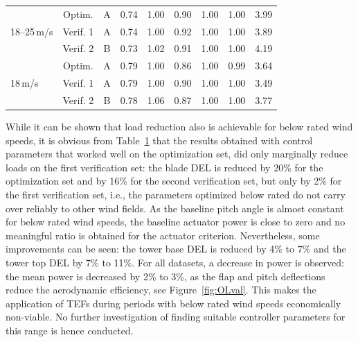 \begin{table}[h]
\begin{tabular}{@{}l*{8}{c}@{}}
        \midrule
        \multirow{3}{*}{18--25\,m/s} & Optim. & A & 0.74 & 1.00 & 0.90 & 1.00 & 1.00 & 3.99 \\
        & Verif. 1 & A & 0.74 & 1.00 & 0.92 & 1.00 & 1.00 & 3.89 \\
        & Verif. 2 & B & 0.73 & 1.02 & 0.91 & 1.00 & 1.00 & 4.19 \\
        \midrule
        \multirow{3}{*}{18\,m/s} & Optim. & A & 0.79 & 1.00 & 0.86 & 1.00 & 0.99 & 3.64 \\
        & Verif. 1 & A & 0.79 & 1.00 & 0.90 & 1.00 & 1.00 & 3.49 \\
        & Verif. 2 & B & 0.78 & 1.06 & 0.87 & 1.00 & 1.00 & 3.77 \\
        \bottomrule
    \end{tabular}
    \label{tabone}
\end{table}

While it can be shown that load reduction also is achievable for below rated wind speeds, it is obvious from Table~\ref{tabone} that the results obtained with control parameters that worked well on the optimization set, did only marginally reduce loads on the first verification set: the blade DEL is reduced by 20\% for the optimization set and by 16\% for the second verification set, but only by 2\% for the first verification set, i.e., the parameters optimized below rated do not carry over reliably to other wind fields. As the baseline pitch angle is almost constant for below rated wind speeds, the baseline actuator power is close to zero and no meaningful ratio is obtained for the actuator criterion. Nevertheless, some improvements can be seen: the tower base DEL is reduced by 4\% to 7\% and the tower top DEL by 7\% to 11\%. For all datasets, a decrease in power is observed: the mean power is decreased by 2\% to 3\%, as the flap and pitch deflections reduce the aerodynamic efficiency, see Figure~\ref{fig:OLval}. This makes the application of TEFs during periods with below rated wind speeds economically non-viable. No further investigation of finding suitable controller parameters for this range is hence conducted.

